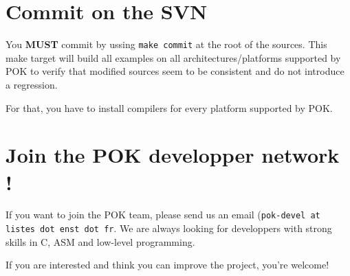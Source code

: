 \documentclass[oneside]{article}
\begin{document}
\section{Commit on the SVN}
You \textbf{MUST} commit by ussing \texttt{make commit} at the root of the
sources. This make target will build all examples on all architectures/platforms
supported by POK to verify that modified sources seem
to be consistent and do not introduce a regression.

For that, you have to install compilers for every platform supported by POK.

\section{Join the POK developper network !}
If you want to join the POK team, please send us an email (\texttt{pok-devel at
listes dot enst dot fr}. We are always looking for developpers with strong
skills in C, ASM and low-level programming.

If you are interested and think you can improve the project, you're welcome!
\end{document}
